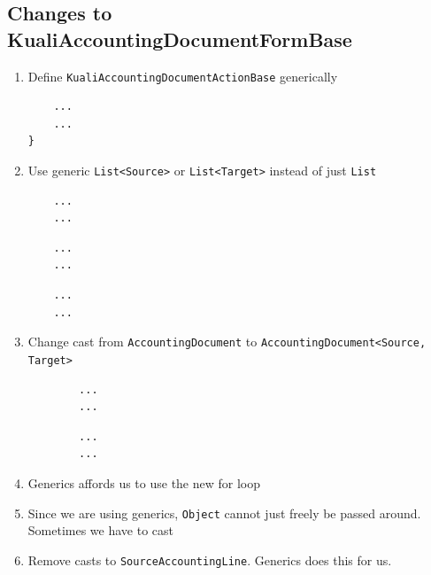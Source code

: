 \documentclass[12pt,notitlepage]{article}
\begin{document}
  \subsection{Changes to KualiAccountingDocumentFormBase}
  \begin{enumerate}
    \item Define \verb|KualiAccountingDocumentActionBase| generically
      
      \begin{lstlisting}
    ...
    ...
}
  \end{lstlisting}
    \item Use generic \verb|List<Source>| or \verb|List<Target>| instead of just \verb|List|
      \begin{lstlisting}
    ...
    ...
      \end{lstlisting}
      
      \begin{lstlisting}
    ...
    ...
      \end{lstlisting}
      
      \begin{lstlisting}
    ...
    ...
      \end{lstlisting}
    \item Change cast from \verb|AccountingDocument| to \verb|AccountingDocument<Source, Target>|
      \begin{lstlisting}
        ...
        ...
      \end{lstlisting}
      
      \begin{lstlisting}
        ...
        ...
      \end{lstlisting}
    \item Generics affords us to use the new for loop
      

    \item Since we are using generics, \verb|Object| cannot just freely be passed around. Sometimes we have to cast
      
      
      \item Remove casts to \verb|SourceAccountingLine|. Generics does this for us.
  \end{enumerate}
\end{document}
